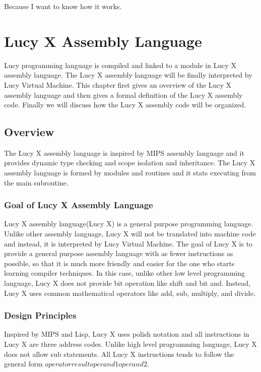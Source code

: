 \begin{savequote}[75mm]
Because I want to know how it works.
\end{savequote}

\chapter{Lucy X Assembly Language}
Lucy programming language is compiled and linked to a module in Lucy X assembly language. The Lucy X assembly language will be finally interpreted by Lucy Virtual Machine. This chapter first gives an overview of the Lucy X assembly language and then gives a formal definition of the Lucy X assembly code. Finally we will discuss how the Lucy X assembly code will be organized.

\section{Overview}
The Lucy X assembly language is inspired by MIPS assembly language and it provides dynamic type checking and scope isolation and inheritance. The Lucy X assembly language is formed by modules and routines and it stats executing from the main subroutine.

\subsection{Goal of Lucy X Assembly Language}
Lucy X assembly language(Lucy X) is a general purpose programming language. Unlike other assembly language, Lucy X will not be translated into machine code and instead, it is interpreted by Lucy Virtual Machine. The goal of Lucy X is to provide a general purpose assembly language with as fewer instructions as possible, so that it is much more friendly and easier for the one who starts learning compiler techniques. In this case, unlike other low level programming language, Lucy X does not provide bit operation like shift and bit and. Instead, Lucy X uses common mathematical operators like add, sub, multiply, and divide.

\subsection{Design Principles}
Inspired by MIPS and Lisp, Lucy X uses polish notation and all instructions in Lucy X are three address codes. Unlike high level programming language, Lucy X does not allow sub statements. All Lucy X instructions tends to follow the general form $operator result operand1 operand2$.

